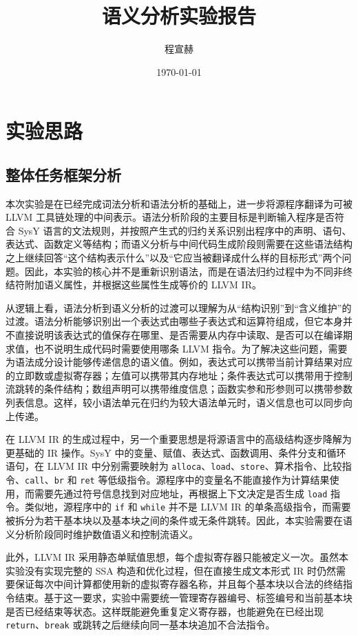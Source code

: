 \documentclass[12pt]{ctexart}
\title{语义分析实验报告}
\author{程宣赫 \quad 2023202250}
\date{\today}
\begin{document}
\maketitle

\section{实验思路}

\subsection{整体任务框架分析}

本次实验是在已经完成词法分析和语法分析的基础上，进一步将源程序翻译为可被 LLVM 工具链处理的中间表示。语法分析阶段的主要目标是判断输入程序是否符合 SysY 语言的文法规则，并按照产生式的归约关系识别出程序中的声明、语句、表达式、函数定义等结构；而语义分析与中间代码生成阶段则需要在这些语法结构之上继续回答“这个结构表示什么”以及“它应当被翻译成什么样的目标形式”两个问题。因此，本实验的核心并不是重新识别语法，而是在语法归约过程中为不同非终结符附加语义属性，并根据这些属性生成等价的 LLVM IR。

从逻辑上看，语法分析到语义分析的过渡可以理解为从“结构识别”到“含义维护”的过渡。语法分析能够识别出一个表达式由哪些子表达式和运算符组成，但它本身并不直接说明该表达式的值保存在哪里、是否需要从内存中读取、是否可以在编译期求值，也不说明生成代码时需要使用哪条 LLVM 指令。为了解决这些问题，需要为语法成分设计能够传递信息的语义值。例如，表达式可以携带当前计算结果对应的立即数或虚拟寄存器；左值可以携带其内存地址；条件表达式可以携带用于控制流跳转的条件结构；数组声明可以携带维度信息；函数实参和形参则可以携带参数列表信息。这样，较小语法单元在归约为较大语法单元时，语义信息也可以同步向上传递。

在 LLVM IR 的生成过程中，另一个重要思想是将源语言中的高级结构逐步降解为更基础的 IR 操作。SysY 中的变量、赋值、表达式、函数调用、条件分支和循环语句，在 LLVM IR 中分别需要映射为 \texttt{alloca}、\texttt{load}、\texttt{store}、算术指令、比较指令、\texttt{call}、\texttt{br} 和 \texttt{ret} 等低级指令。源程序中的变量名不能直接作为计算结果使用，而需要先通过符号信息找到对应地址，再根据上下文决定是否生成 \texttt{load} 指令。类似地，源程序中的 \texttt{if} 和 \texttt{while} 并不是 LLVM IR 的单条高级指令，而需要被拆分为若干基本块以及基本块之间的条件或无条件跳转。因此，本实验需要在语义分析阶段同时维护数值语义和控制流语义。

此外，LLVM IR 采用静态单赋值思想，每个虚拟寄存器只能被定义一次。虽然本实验没有实现完整的 SSA 构造和优化过程，但在直接生成文本形式 IR 时仍然需要保证每次中间计算都使用新的虚拟寄存器名称，并且每个基本块以合法的终结指令结束。基于这一要求，实验中需要统一管理寄存器编号、标签编号和当前基本块是否已经结束等状态。这样既能避免重复定义寄存器，也能避免在已经出现 \texttt{return}、\texttt{break} 或跳转之后继续向同一基本块追加不合法指令。
\end{document}
